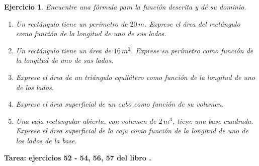 \documentclass[12pt,tikz,border=5pt]{article}
\newtheorem{ejercicio}{Ejercicio}[section]
\begin{document}
\begin{ejercicio}
  Encuentre una fórmula para la función descrita y dé su dominio. 
  \begin{enumerate}[label=(\alph*)]
    \item Un rectángulo tiene un perímetro de $20\,m$. Exprese el área del rectángulo como función de la longitud de uno de sus lados.
    \item Un rectángulo tiene un área de $16\,m^2$. Exprese su perímetro como función de la longitud de uno de sus lados.
    \item Exprese el área de un triángulo equilátero como función de la longitud de uno de los lados.
    \item Exprese el área superficial de un cubo como función de su volumen.
    \item Una caja rectangular abierta, con volumen de $2\,m^3$, tiene una base cuadrada. Exprese el área superficial de la caja como función de la longitud de uno de los lados de la base.
  \end{enumerate}
\end{ejercicio}
\textbf{Tarea: ejercicios 52 - 54, 56, 57 del libro \citep{stewart2001calculo}.}



\end{document}
